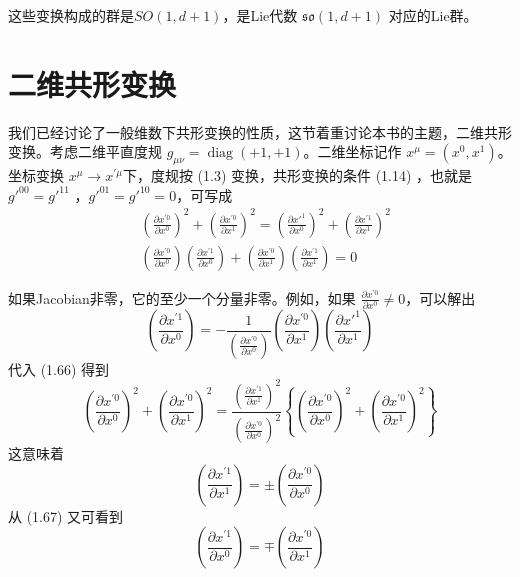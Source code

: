 这些变换构成的群是$ SO(1,d+1) $，是Lie代数 $\mathfrak{so}(1,d+1)$ 对应的Lie群。


\section{二维共形变换}
我们已经讨论了一般维数下共形变换的性质，这节着重讨论本书的主题，二维共形变换。考虑二维平直度规 $g_{\mu \nu}=\operatorname{diag}(+1,+1) $。二维坐标记作 $x^{\mu}=\left(x^{0}, x^{1}\right) $。坐标变换 $x^{\mu} \rightarrow x^{\prime \mu} $下，度规按 (1.3) 变换，共形变换的条件 (1.14) ，也就是$ g'^{00}=g'^{11}$ ，$ g'^{01}=g'^{10}=0 $，可写成
\begin{align} & \left(\frac{\partial x^{\prime 0}}{\partial x^{0}}\right)^{2}+\left(\frac{\partial x^{\prime 0}}{\partial x^{1}}\right)^{2}=\left(\frac{\partial x'^{1}}{\partial x^{0}}\right)^{2}+\left(\frac{\partial x^{\prime 1}}{\partial x^{1}}\right)^{2}\\ &\left(\frac{\partial x^{\prime 0}}{\partial x^{0}}\right)\left(\frac{\partial x^{\prime 1}}{\partial x^{0}}\right)+\left(\frac{\partial x^{\prime 0}}{\partial x^{1}}\right)\left(\frac{\partial x^{\prime 1}}{\partial x^{1}}\right)=0 \end{align}

如果Jacobian非零，它的至少一个分量非零。例如，如果 $\frac{\partial x^{\prime 0}}{\partial x^{0}} \neq 0 $，可以解出
\[
\left(\frac{\partial x^{\prime 1}}{\partial x^{0}}\right)=-\frac{1}{\left(\frac{\partial x^{\prime 0}}{\partial x^{0}}\right)}\left(\frac{\partial x^{\prime 0}}{\partial x^{1}}\right)\left(\frac{\partial x'^{1}}{\partial x^{1}}\right)\]
代入 (1.66) 得到
$$
\left(\frac{\partial x^{\prime 0}}{\partial x^{0}}\right)^{2}+\left(\frac{\partial x^{\prime 0}}{\partial x^{1}}\right)^{2}=\frac{\left(\frac{\partial x^{\prime 1}}{\partial x^{1}}\right)^{2}}{\left(\frac{\partial x^{\prime 0}}{\partial x^{0}}\right)^{2}}\left\{\left(\frac{\partial x^{\prime 0}}{\partial x^{0}}\right)^{2}+\left(\frac{\partial x^{\prime 0}}{\partial x^{1}}\right)^{2}\right\}$$
这意味着
\begin{equation}
		\left(\frac{\partial x^{\prime 1}}{\partial x^{1}}\right)=\pm\left(\frac{\partial x^{\prime 0}}{\partial x^{0}}\right)
\end{equation}
从 (1.67) 又可看到
\begin{equation}
	\left(\frac{\partial x^{\prime 1}}{\partial x^{0}}\right)=\mp\left(\frac{\partial x^{\prime 0}}{\partial x^{1}}\right)
\end{equation}

